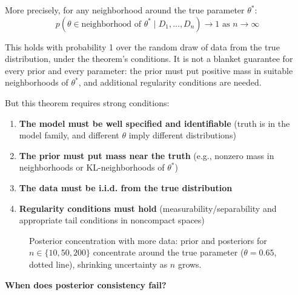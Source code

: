 More precisely, for any neighborhood around the true parameter $\theta^*$:
\begin{equation}
p(\theta \in \text{neighborhood of } \theta^* \mid D_1, \ldots, D_n) \to 1 \text{ as } n \to \infty
\end{equation}

This holds with probability 1 over the random draw of data from the true distribution, under the theorem's conditions. It is not a blanket guarantee for every prior and every parameter: the prior must put positive mass in suitable neighborhoods of $\theta^*$, and additional regularity conditions are needed.

But this theorem requires strong conditions:

\begin{enumerate}
\item \textbf{The model must be well specified and identifiable} (truth is in the model family, and different $\theta$ imply different distributions)
\item \textbf{The prior must put mass near the truth} (e.g., nonzero mass in neighborhoods or KL-neighborhoods of $\theta^*$)
\item \textbf{The data must be i.i.d. from the true distribution}
\item \textbf{Regularity conditions must hold} (measurability/separability and appropriate tail conditions in noncompact spaces)
\end{enumerate}

\begin{figure}[t]
\centering

\caption{Posterior concentration with more data: prior and posteriors for $n\in\{10,50,200\}$ concentrate around the true parameter ($\theta=0.65$, dotted line), shrinking uncertainty as $n$ grows.}
\label{fig:posterior_concentration}
\end{figure}

\textbf{When does posterior consistency fail?}

